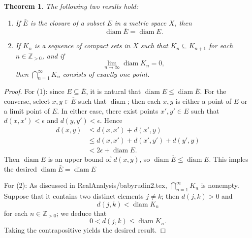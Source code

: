 \documentclass[11pt]{article}
\newcommand{\diam}{\operatorname{diam}}
\newtheorem{theorem}{Theorem}
\begin{document}
\begin{theorem}
	The following two results hold:
	\begin{enumerate}
		\item If $\overline{E}$ is the closure of a subset $E$ in a metric space $X$, then
		\[
			\diam \overline{E} = \diam E.
		\]
		\item If $K_{n}$ is a sequence of compact sets in $X$ such that $K_{n} \subseteq K_{n + 1}$ for each $n \in \mathbb{Z}_{> 0}$, and if
		\[
			\lim\limits_{n \to \infty} \diam K_{n} = 0,
		\]
		then $\bigcap_{n = 1}^{\infty} K_{n}$ consists of exactly one point.
	\end{enumerate}
\end{theorem}
\begin{adjustwidth}{0.5cm}{}
	\begin{proof}
		For (1): since $E \subseteq \overline{E}$, it is natural that $\diam E \le \diam \overline{E}$. For the converse, select $x, y \in \overline{E}$ such that $\diam $; then each $x, y$ is either a point of $E$ or a limit point of $E$. In either case, there exist points $x', y' \in E$ such that $d(x, x') < \epsilon$ and $d(y, y') < \epsilon$. Hence
		\begin{align*}
			d(x, y) &\le d(x, x') + d(x', y) \\
			&\le d(x, x') + d(x', y') + d(y', y) \\ 
			&< 2\epsilon + \diam E.
		\end{align*}
		Then $\diam E$ is an upper bound of $d(x, y)$, so $\diam \overline{E} \le \diam E$. This imples the desired $\diam \overline{E} = \diam E$

		For (2): As discussed in RealAnalysis/babyrudin2.tex, $\bigcap_{n = 1}^{\infty} K_{n}$ is nonempty. Suppose that it contains two distinct elements $j \ne k$; then $d(j, k) > 0$ and
		\[
			d(j, k) < \diam K_{n}
		\]
		for each $n \in \mathbb{Z}_{> 0}$; we deduce that
		\[
			0 < d(j, k) \le \diam K_{n}.
		\]
		Taking the contrapositive yields the desired result.
	\end{proof}
\end{adjustwidth}

\end{document}
